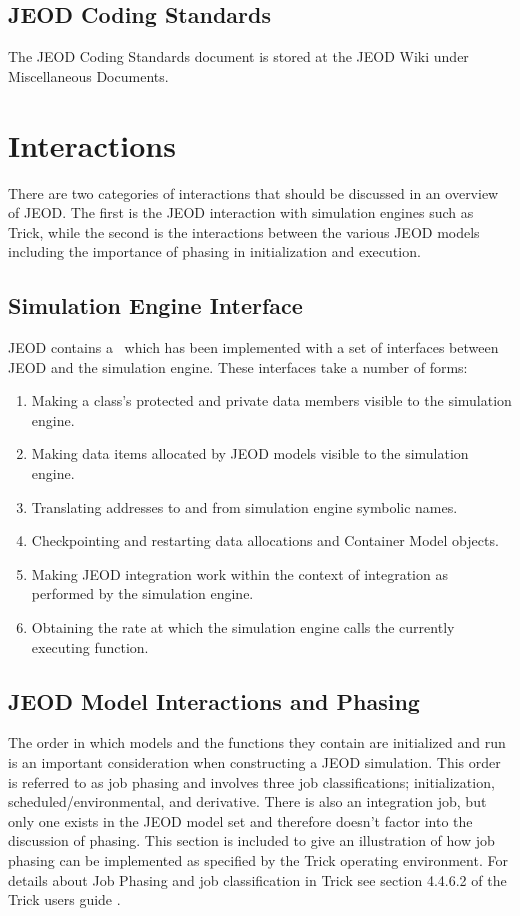 \subsection{JEOD Coding Standards}
The JEOD Coding Standards \cite{dynenv:CODE_STANDARD} document is stored at the JEOD Wiki under Miscellaneous Documents.

\section{Interactions}
There are two categories of interactions that should be discussed in an overview of JEOD.  The first is the JEOD interaction with simulation engines such as Trick, while the second is the interactions between the various JEOD models including the importance of phasing in initialization and execution.

\subsection{Simulation Engine Interface}
JEOD contains a \ which has been implemented with a set of interfaces between JEOD and the simulation engine. These interfaces take a number of forms:
\begin{enumerate}
\item  Making a class's protected and private data members visible to the simulation engine.
\item  Making data items allocated by JEOD models visible to the simulation engine.
\item  Translating addresses to and from simulation engine symbolic names.
\item  Checkpointing and restarting data allocations and Container Model objects.
\item  Making JEOD integration work within the context of integration as performed by the simulation engine.
\item  Obtaining the rate at which the simulation engine calls the currently executing function.
\end{enumerate}

\subsection{JEOD Model Interactions and Phasing}\label{sec:phasing}
The order in which models and the functions they contain are initialized and run is an important consideration when constructing a JEOD simulation. This order is referred to as job phasing and involves three job classifications; initialization, scheduled/environmental, and derivative.  There is also an integration job, but only one exists in the JEOD model set and therefore doesn't factor into the discussion of phasing.  This section is included to give an illustration of how job phasing can be implemented as specified by the Trick operating environment. For details about Job Phasing and job classification in Trick see section 4.4.6.2 of the Trick users guide \cite{Vetter:TrickUser}.

